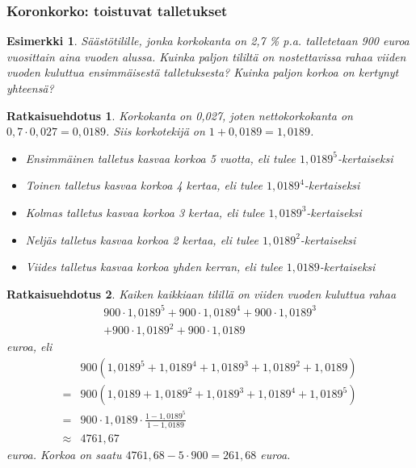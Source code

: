 \documentclass[]{beamer}\usepackage[]{graphicx}\usepackage[]{color}
\newtheorem{esim}{Esimerkki}
\newtheorem{ratkaisu}{Ratkaisuehdotus}
\begin{document}
\begin{frame}
\frametitle{Koronkorko: toistuvat talletukset}
	\begin{esim}
		Säästötilille, jonka korkokanta on 2,7 \% p.a. talletetaan 900 euroa vuosittain aina vuoden alussa.
		Kuinka paljon tililtä on nostettavissa rahaa viiden vuoden kuluttua ensimmäisestä talletuksesta?
		Kuinka paljon korkoa on kertynyt yhteensä?
	\end{esim}
\end{frame}

\begin{frame}
	\begin{ratkaisu}
		\pause 
    Korkokanta on 0,027, joten nettokorkokanta on \(0,7\cdot0,027 = 0,0189\). \pause
		Siis korkotekijä on \(1+0,0189 =	1,0189\). \pause
		\begin{itemize}
		    \item Ensimmäinen talletus kasvaa korkoa 5 vuotta, eli tulee \(1,0189^5\)-kertaiseksi\pause
		    \item Toinen talletus kasvaa korkoa 4 kertaa, eli tulee \(1,0189^4\)-kertaiseksi\pause
		    \item Kolmas talletus kasvaa korkoa 3 kertaa, eli tulee \(1,0189^3\)-kertaiseksi\pause
		    \item Neljäs talletus kasvaa korkoa 2 kertaa, eli tulee \(1,0189^2\)-kertaiseksi\pause
		    \item Viides talletus kasvaa korkoa yhden kerran, eli tulee \(1,0189\)-kertaiseksi
		\end{itemize}
	\end{ratkaisu}
\end{frame}


\begin{frame}
    \begin{ratkaisu}
        Kaiken kaikkiaan tilillä on viiden vuoden kuluttua rahaa
        \begin{multline*}
            900\cdot1,0189^5 + 900\cdot1,0189^4 + 900\cdot1,0189^3\\
             +900\cdot1,0189^2 + 900\cdot1,0189
        \end{multline*}
        euroa, eli\pause
        \begin{align*}
            &900(1,0189^5 + 1,0189^4 + 1,0189^3 + 1,0189^2 + 1,0189)\\
            =&900(1,0189 + 1,0189^2 + 1,0189^3 + 1,0189^4 + 1,0189^5)\\
            =&900\cdot1,0189\cdot\frac{1-1,0189^5}{1-1,0189}\\
            \approx & 4761,67
        \end{align*}
        euroa. \pause Korkoa on saatu \(4761,68-5\cdot900 = 261,68\) euroa.
    \end{ratkaisu}
\end{frame}
\end{document}
